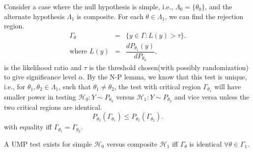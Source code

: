 \documentclass[a4paper,english,12pt]{article}
\begin{document}
\begin{exmp} 
Consider a case where the null hypothesis is simple, i.e., $\Lambda_0 = \{\theta_0\}$, and the alternate hypothesis $\Lambda_1$ is composite. For each $\theta \in \Lambda_1$, we can find the rejection region.
\begin{eqnarray}
\Gamma_\theta &=& \{y \in \Gamma: L(y) > \tau\}.\\
\mbox{where  } L(y) &=& \dfrac{dP_{\theta_1}(y)}{dP_{\theta_0}},	
\end{eqnarray}		
is the likelihood ratio and $\tau$ is the threshold chosen(with possibly randomization) to give significance level $\alpha$. By the N-P lemma, we know that this test is unique, i.e., for $\theta_1, \theta_2 \in \Lambda_1$, such that $\theta_1 \neq \theta_2 $, the test with critical region $\Gamma_{\theta_1}$ will have smaller power in testing $\mathcal{H}_0: Y \sim P_{\theta_0}$ versus $\mathcal{H}_1: Y \sim P_{\theta_2}$ and vice versa unless the two critical regions are identical.	
\begin{equation*}
P_{\theta_{2}}(\Gamma_{\theta_1}) \leq P_{\theta_{2}}(\Gamma_{\theta_2}).
\end{equation*}
with equality iff $\Gamma_{\theta_1} = \Gamma_{\theta_2}$.
\begin{cor}
{A UMP test exists for simple $\mathcal{H}_0$ versus composite $\mathcal{H}_1$ iff $\Gamma_\theta$ is identical $\forall \theta \in \Gamma_1$.}	
\end{cor}
\end{exmp}
\end{document}
